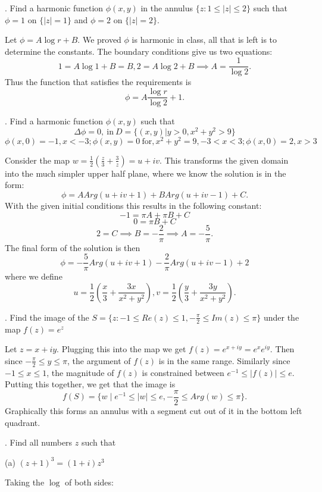 \documentclass[letterpaper, reqno,11pt]{article}
\begin{document}
\medskip

. Find a harmonic function $\phi (x, y)$ in the annulus $ \{ z: 1\leq |z| \leq 2 \}$ such that $\phi=1$ on $ \{ |z|=1\}$ and $\phi=2$ on $ \{|z|=2\}$.

Let $\phi=A\log r+B$. We proved $\phi$ is harmonic in class, all that is left is to determine the constants. The boundary conditions give us two equations: 
\[
1=A\log 1+B=B, 2=A\log 2+B\implies A=\frac{1}{\log 2}
.\]
Thus the function that satisfies the requirements is 
\[
\phi=A \frac{\log r}{\log 2}+1
.\]


\medskip


. Find a harmonic function $\phi (x,y)$ such that
$$ \Delta \phi=0, \ \mbox{in} \ D= \{ (x,y) | y>0, x^2+y^2>9 \} $$
$$ \phi (x,0)=-1, x<-3; \phi (x,y)=0 \ \mbox{for}, x^2+y^2=9, -3<x<3; \phi (x,0)=2, x>3 $$

\medskip

Consider the map $w=\frac{1}{2}\left( \frac{z}{3}+\frac{3}{z} \right) =u+iv$. This transforms the given domain into the much simpler upper half plane, where we know the solution is in the form: 
\[
\phi=A Arg(u+iv+1)+B Arg(u+iv-1)+ C
.\]
With the given initial conditions this results in the following constant: 
\[
-1=\pi A+\pi B+C
\]
\[
0=\pi B+C
\]
\[
2=C\implies B=-\frac{2}{\pi}\implies A=-\frac{5}{\pi}
.\]
The final form of the solution is then 
\[
\phi=-\frac{5}{\pi} Arg(u+iv+1)-\frac{2}{\pi} Arg(u+iv-1)+ 2
\]
where we define
\[
u=\frac{1}{2}\left( \frac{x}{3}+\frac{3x}{x^2+y^2} \right), v=\frac{1}{2}\left( \frac{y}{3}+\frac{3y}{x^2+y^2} \right) 
.\]

. Find the image of the $S= \{ z: -1\leq Re (z) \leq 1, -\frac{\pi}{2} \leq Im (z) \leq \pi \}$ under the map $ f(z)= e^z$

Let $z=x+iy$. Plugging this into the map we get $f(z)=e^{x+iy}=e^{x}e^{iy}$. Then since $-\frac{\pi}{2}\leq y\leq\pi$, the argument of $f(z)$ is in the same range. Similarly since $-1\leq x\leq 1$, the magnitude of $f(z)$ is constrained between $e^{-1}\leq |f(z)|\leq e$. Putting this together, we get that the image is 
\[
f(S)=\{w\mid e^{-1}\leq |w|\leq e, -\frac{\pi}{2}\leq Arg(w)\leq \pi\} 
.\]
Graphically this forms an annulus with a segment cut out of it in the bottom left quadrant. 

\medskip


. Find all numbers $z$ such that

(a) $(z+1)^3=(1+i)z^3$

Taking the $\log$ of both sides:
\end{document}
